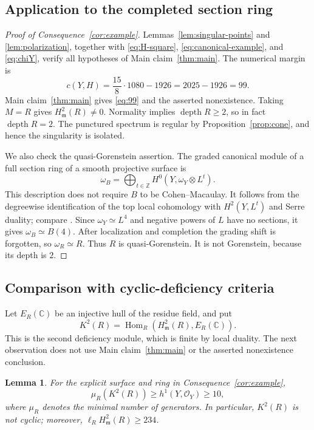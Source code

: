 \documentclass[11pt,reqno]{amsart}
\numberwithin{equation}{section}
\newtheorem{lemma}[theorem]{Lemma}
\theoremstyle{definition}
\theoremstyle{remark}
\newcommand{\C}{\mathbb C}
\newcommand{\Z}{\mathbb Z}
\newcommand{\OO}{\mathcal O}
\newcommand{\mm}{\mathfrak m}
\newcommand{\depth}{\operatorname{depth}}
\newcommand{\Hom}{\operatorname{Hom}}
\newcommand{\len}{\ell}
\begin{document}
\subsection{Application to the completed section ring}

\begin{proof}[Proof of Consequence~\ref{cor:example}]
Lemmas~\ref{lem:singular-points} and \ref{lem:polarization}, together
with \eqref{eq:H-square}, \eqref{eq:canonical-example}, and
\eqref{eq:chiY}, verify all hypotheses of Main claim~\ref{thm:main}.
The numerical margin is
\[
 c(Y,H)=\frac{15}{8}\cdot1080-1926=2025-1926=99.
\]
Main claim~\ref{thm:main} gives \eqref{eq:99} and the asserted
nonexistence. Taking $M=R$ gives $H^2_\mm(R)\ne0$.
Normality implies $\depth R\geq2$, so in fact $\depth R=2$.
The punctured spectrum is regular by Proposition~\ref{prop:cone},
and hence the singularity is isolated.

We also check the quasi-Gorenstein assertion. The graded canonical
module of a full section ring of a smooth projective surface is
\[
 \omega_B=\bigoplus_{t\in\Z}H^0(Y,\omega_Y\otimes L^t).
\]
This description does not require $B$ to be Cohen--Macaulay. It
follows from the degreewise identification of the top local cohomology
with $H^2(Y,L^t)$ and Serre duality; compare
\cite[Corollary 4.3]{Anghel2026}. Since $\omega_Y\simeq L^4$ and
negative powers of $L$ have no sections, it gives
$\omega_B\simeq B(4)$. After localization and completion the grading
shift is forgotten, so $\omega_R\simeq R$. Thus $R$ is
quasi-Gorenstein. It is not Gorenstein, because its depth is $2$.
\end{proof}

\subsection{Comparison with cyclic-deficiency criteria}
Let $E_R(\C)$ be an injective hull of the residue field, and put
\[
 K^2(R)=\Hom_R(H^2_\mm(R),E_R(\C)).
\]
This is the second deficiency module, which is finite by local duality.
The next observation does not use Main claim~\ref{thm:main} or the
asserted nonexistence conclusion.

\begin{lemma}\label{lem:noncyclic-deficiency}
For the explicit surface and ring in Consequence~\ref{cor:example},
\[
 \mu_R(K^2(R))\geq h^1(Y,\OO_Y)\geq10,
\]
where $\mu_R$ denotes the minimal number of generators. In particular,
$K^2(R)$ is not cyclic; moreover, $\len_RH^2_\mm(R)\geq234$.
\end{lemma}
\end{document}
